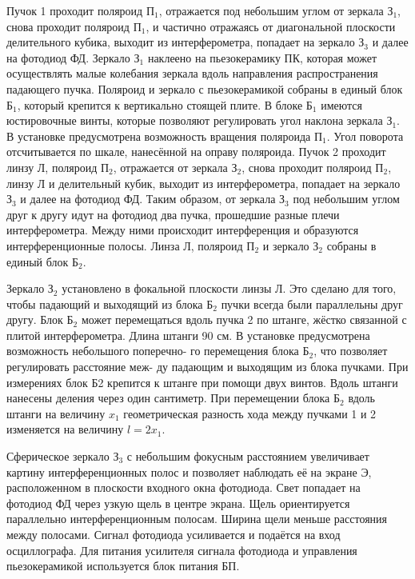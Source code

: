 \documentclass[12pt]{article}
\begin{document}
    Пучок 1 проходит поляроид $ \text{П}_1 $, отражается под небольшим углом от зеркала $ \text{З}_1 $,
    снова проходит поляроид $ \text{П}_1 $, и частично отражаясь от диагональной плоскости
    делительного кубика, выходит из интерферометра, попадает на зеркало $ \text{З}_3 $
    и далее на фотодиод ФД.
    Зеркало $ \text{З}_1 $ наклеено на пьезокерамику ПК,
    которая может осуществлять малые колебания зеркала вдоль направления распространения падающего пучка.
    Поляроид и зеркало с пьезокерамикой собраны в единый блок $ \text{Б}_1 $,
    который крепится к вертикально стоящей плите.
    В блоке $ \text{Б}_1 $ имеются юстировочные винты, которые позволяют регулировать
    угол наклона зеркала $ \text{З}_1 $.
    В установке предусмотрена возможность вращения поляроида $ \text{П}_1 $.
    Угол поворота отсчитывается по шкале, нанесённой на оправу поляроида.
    Пучок 2 проходит линзу Л, поляроид $ \text{П}_2 $, отражается от зеркала $ \text{З}_2 $,
    снова проходит поляроид $ \text{П}_2 $, линзу Л и делительный кубик,
    выходит из интерферометра, попадает на зеркало $ \text{З}_3 $ и далее на фотодиод ФД.
    Таким образом, от зеркала $ \text{З}_3 $ под небольшим углом друг к другу идут
    на фотодиод два пучка, прошедшие разные плечи интерферометра.
    Между ними происходит интерференция и образуются интерференционные полосы.
    Линза Л, поляроид $ \text{П}_2 $ и зеркало $ \text{З}_2 $ собраны в единый блок $ \text{Б}_2 $.

    Зеркало $ \text{З}_2 $ установлено в фокальной плоскости линзы Л. Это сделано
    для того, чтобы падающий и выходящий из блока $ \text{Б}_2 $ пучки всегда были
    параллельны друг другу. Блок $ \text{Б}_2 $ может перемещаться вдоль пучка 2
    по штанге, жёстко связанной с плитой интерферометра. Длина штанги
    90 см. В установке предусмотрена возможность небольшого поперечно-
    го перемещения блока $ \text{Б}_2 $, что позволяет регулировать расстояние меж-
    ду падающим и выходящим из блока пучками. При измерениях блок
    Б2 крепится к штанге при помощи двух винтов. Вдоль штанги нанесены деления через один сантиметр. При перемещении блока $ \text{Б}_2 $ вдоль
    штанги на величину $ x_1 $ геометрическая разность хода между пучками
    1 и 2 изменяется на величину $ l = 2x_1 $.

    Сферическое зеркало $ \text{З}_3 $ с небольшим фокусным расстоянием увеличивает картину интерференционных полос и позволяет наблюдать её
    на экране Э, расположенном в плоскости входного окна фотодиода.
    Свет попадает на фотодиод ФД через узкую щель в центре экрана.
    Щель ориентируется параллельно интерференционным полосам. Ширина щели меньше расстояния между полосами. Сигнал фотодиода усиливается и подаётся на вход осциллографа. Для питания усилителя
    сигнала фотодиода и управления пьезокерамикой используется блок
    питания БП.
\end{document}
